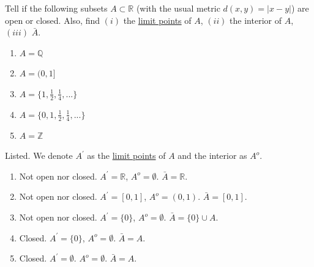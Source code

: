   \begin{exercise}
    Tell if the following subsets $A \subset \mathbb{R}$ (with the usual metric $d(x,y) = |x-y|$)
    are open or closed. Also, find $(i)$ the \hyperref[pst-def:limit-point]{limit points} of $A$, $(ii)$ the interior of
    $A$, $(iii)$ $\bar{A}$.
    \begin{enumerate}
      \item $A = \mathbb{Q}$
      \item $A = (0,1]$
      \item $A = \{1, \frac{1}{2}, \frac{1}{4}, ...\}$
      \item $A = \{0, 1, \frac{1}{2}, \frac{1}{4}, ...\}$
      \item $A = \mathbb{Z}$
    \end{enumerate}
  \end{exercise} 
  \begin{solution}
    Listed. We denote $A^\prime$ as the \hyperref[pst-def:limit-point]{limit points} of $A$ and the interior as $A^o$. 
    \begin{enumerate}
      \item Not open nor closed. $A^\prime = \mathbb{R}$, $A^o = \emptyset$. $\bar{A} = \mathbb{R}$. 
      \item Not open nor closed. $A^\prime = [0, 1]$, $A^o = (0, 1)$. $\bar{A} = [0, 1]$. 
      \item Not open nor closed. $A^\prime = \{0\}$, $A^o = \emptyset$. $\bar{A} = \{ 0 \} \cup A$. 
      \item Closed. $A^\prime = \{0\}$, $A^o = \emptyset$. $\bar{A} = A$. 
      \item Closed. $A^\prime = \emptyset$. $A^o = \emptyset$. $\bar{A} = A$. 
    \end{enumerate}
  \end{solution}
  

